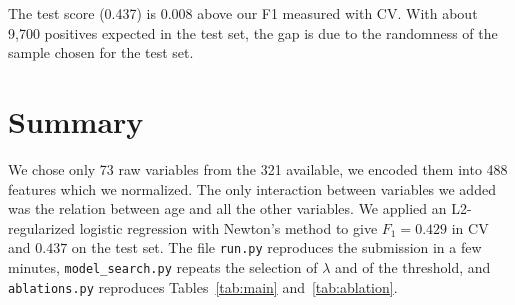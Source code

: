 \documentclass[10pt,conference,compsocconf]{IEEEtran}
\begin{document}
The test score (0.437) is 0.008 above our F1 measured with CV. With about 9{,}700 positives expected in the test set, the gap is due to the randomness of the sample chosen for the test set.

\section{Summary}
We chose only 73 raw variables from the 321 available, we encoded them into 488 features which we normalized. The only interaction between variables we added was the relation between age and all the other variables. We applied an L2-regularized logistic regression with Newton's method to give $F_1 = 0.429$ in CV and $0.437$ on the test set. The file \texttt{run.py} reproduces the submission in a few minutes, \texttt{model\_search.py} repeats the selection of $\lambda$ and of the threshold, and \texttt{ablations.py} reproduces Tables~\ref{tab:main} and~\ref{tab:ablation}.



\end{document}
